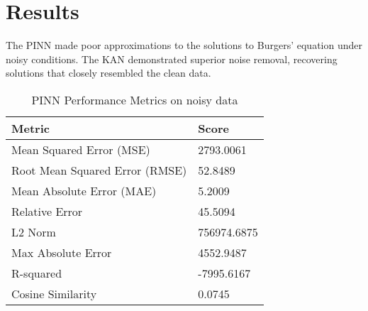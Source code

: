 \documentclass[conference]{IEEEtran}
\begin{document}
\section{Results}
The PINN made poor approximations to the solutions to Burgers' equation under noisy conditions. The KAN demonstrated superior noise removal, recovering solutions that closely resembled the clean data.

\begin{table}[h!]
\centering
\begin{tabular}{|l|l|}
\hline
\textbf{Metric}                  & \textbf{Score}                     \\ \hline
Mean Squared Error (MSE)          & 2793.0061                           \\ \hline
Root Mean Squared Error (RMSE)    & 52.8489                             \\ \hline
Mean Absolute Error (MAE)         & 5.2009                              \\ \hline
Relative Error                    & 45.5094                             \\ \hline
L2 Norm                           & 756974.6875                         \\ \hline
Max Absolute Error                & 4552.9487                           \\ \hline
R-squared                         & -7995.6167                          \\ \hline
Cosine Similarity                 & 0.0745                              \\ \hline
\end{tabular}
\vspace{5pt} %
\caption{PINN Performance Metrics on noisy data}
\end{table}
\end{document}
